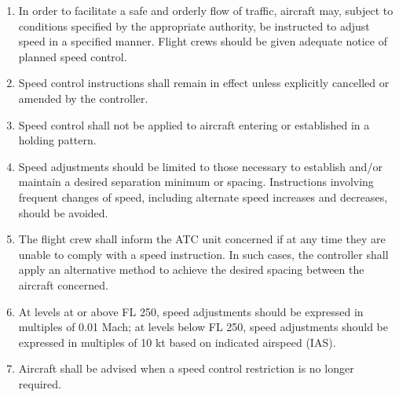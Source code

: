 \documentclass[../main.tex]{subfiles}
\begin{document}
    \begin{enumerate}
        \item In order to facilitate a safe and orderly flow of traffic, aircraft may, subject to conditions specified by the appropriate authority, be instructed to adjust speed in a specified manner. Flight crews should be given adequate notice of planned speed control.



        \item Speed control instructions shall remain in effect unless explicitly cancelled or amended by the controller.


        \item Speed control shall not be applied to aircraft entering or established in a holding pattern.
        \item Speed adjustments should be limited to those necessary to establish and/or maintain a desired separation minimum or spacing. Instructions involving frequent changes of speed, including alternate speed increases and decreases, should be avoided.
        \item The flight crew shall inform the ATC unit concerned if at any time they are unable to comply with a speed instruction. In such cases, the controller shall apply an alternative method to achieve the desired spacing between the aircraft concerned.
        \item At levels at or above FL 250, speed adjustments should be expressed in multiples of 0.01 Mach; at levels below FL 250, speed adjustments should be expressed in multiples of 10 kt based on indicated airspeed (IAS).



        \item Aircraft shall be advised when a speed control restriction is no longer required.
    \end{enumerate}
\end{document}
